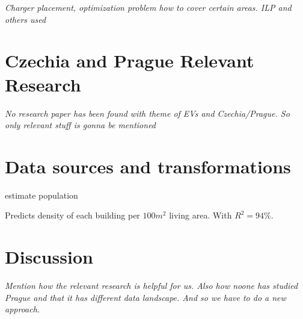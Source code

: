 \textit{Charger placement, optimization problem how to cover certain areas. ILP and others used}


\section{Czechia and Prague Relevant Research}

\textit{No research paper has been found with theme of EVs and Czechia/Prague. So only relevant stuff is gonna be mentioned}



\section{Data sources and transformations}
estimate population

Predicts density of each building per $100m^2$ living area. With $R^2 = 94\%$.


\section{Discussion}

\textit{Mention how the relevant research is helpful for us. Also how noone has studied Prague and that it has different data landscape. And so we have to do a new approach.}

